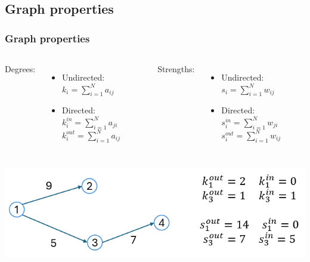 \documentclass{beamer}
\begin{document}
\subsection{Graph properties}
\begin{frame}
\frametitle{Graph properties}  

\begin{columns}
    Degrees: 
    \begin{itemize}
        \item Undirected: $k_i = \sum_{i=1}^{N} a_{ij}$
        \item Directed: \\ \hspace{10px} $k_i^{in} = \sum_{i=1}^{N} a_{ji}$ \\
        \hspace{10px} $k_i^{out} = \sum_{i=1}^{N} a_{ij}$
    \end{itemize}
     Strengths: 
    \begin{itemize}
        \item Undirected: $s_i = \sum_{i=1}^{N} w_{ij}$
        \item Directed: \\ 
        \hspace{10px}$s_i^{in} = \sum_{i=1}^{N} w_{ji}$ \\
        \hspace{10px}$s_i^{out} = \sum_{i=1}^{N} w_{ij}$
    \end{itemize}
\end{columns} 
\vspace{30px}
\centering
\includegraphics[scale=0.5]{img/degrees_strengths.png}
\end{frame}
\end{document}
